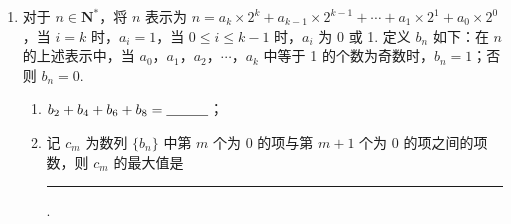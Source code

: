 \begin{description}
\begin{enumerate}[leftmargin=5pt]
        \item 对于 \(n \in \mathbf{N}^*\)，将 \(n\) 表示为 \(n = a_k \times 2^k + a_{k-1} \times 2^{k-1} + \cdots + a_1 \times 2^1 + a_0 \times 2^0\)，当 \(i = k\) 时，\(a_i = 1\)，当 \(0 \leqslant i \leqslant k - 1\) 时，\(a_i\) 为 0 或 1. 定义 \(b_n\) 如下：在 \(n\) 的上述表示中，当 \(a_0\)，\(a_1\)，\(a_2\)，\(\cdots\)，\(a_k\) 中等于 1 的个数为奇数时，\(b_n = 1\)；否则 \(b_n = 0\).
\begin{enumerate}
\item \( b_{2}+b_{4}+b_{6}+b_{8}=\rule[-0.3ex]{3em}{0.4pt}\)；
\item 记 \(c_{m}\) 为数列 \(\{b_{n}\}\) 中第 \(m\) 个为 0 的项与第 \(m + 1\) 个为 0 的项之间的项数，则 \(c_{m}\) 的最大值是\rule[-0.3ex]{3em}{0.4pt}.
\end{enumerate}

    \end{enumerate}

\end{description}

